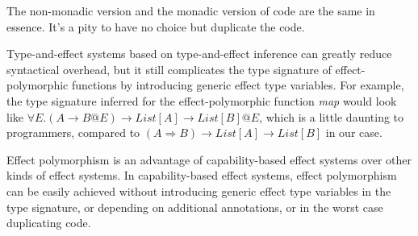 The non-monadic version and the monadic version of code are the same
in essence. It's a pity to have no choice but duplicate the code.

Type-and-effect systems based on type-and-effect
inference\cite{talpin1992polymorphic, talpin1994type} can greatly
reduce syntactical overhead, but it still complicates the type
signature of effect-polymorphic functions by introducing generic
effect type variables. For example, the type signature inferred for
the effect-polymorphic function \emph{map} would look like
$\forall E.(A \to B @E) \to List[A] \to List[B] @E$, which is a little
daunting to programmers, compared to
$(A \Rightarrow B) \to List[A] \to List[B]$ in our case.

Effect polymorphism is an advantage of capability-based effect systems
over other kinds of effect systems. In capability-based effect
systems, effect polymorphism can be easily achieved without
introducing generic effect type variables in the type signature, or
depending on additional annotations, or in the worst case duplicating
code.
